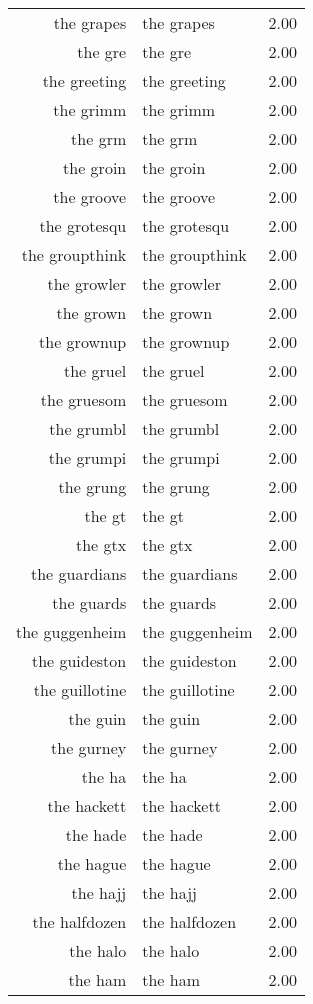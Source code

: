 \begin{table}[ht]
\begin{tabular}{rlr}
  the grapes & the grapes & 2.00 \\ 
  the gre & the gre & 2.00 \\ 
  the greeting & the greeting & 2.00 \\ 
  the grimm & the grimm & 2.00 \\ 
  the grm & the grm & 2.00 \\ 
  the groin & the groin & 2.00 \\ 
  the groove & the groove & 2.00 \\ 
  the grotesqu & the grotesqu & 2.00 \\ 
  the groupthink & the groupthink & 2.00 \\ 
  the growler & the growler & 2.00 \\ 
  the grown & the grown & 2.00 \\ 
  the grownup & the grownup & 2.00 \\ 
  the gruel & the gruel & 2.00 \\ 
  the gruesom & the gruesom & 2.00 \\ 
  the grumbl & the grumbl & 2.00 \\ 
  the grumpi & the grumpi & 2.00 \\ 
  the grung & the grung & 2.00 \\ 
  the gt & the gt & 2.00 \\ 
  the gtx & the gtx & 2.00 \\ 
  the guardians & the guardians & 2.00 \\ 
  the guards & the guards & 2.00 \\ 
  the guggenheim & the guggenheim & 2.00 \\ 
  the guideston & the guideston & 2.00 \\ 
  the guillotine & the guillotine & 2.00 \\ 
  the guin & the guin & 2.00 \\ 
  the gurney & the gurney & 2.00 \\ 
  the ha & the ha & 2.00 \\ 
  the hackett & the hackett & 2.00 \\ 
  the hade & the hade & 2.00 \\ 
  the hague & the hague & 2.00 \\ 
  the hajj & the hajj & 2.00 \\ 
  the halfdozen & the halfdozen & 2.00 \\ 
  the halo & the halo & 2.00 \\ 
  the ham & the ham & 2.00 \\ 

\end{tabular}
\end{table}
